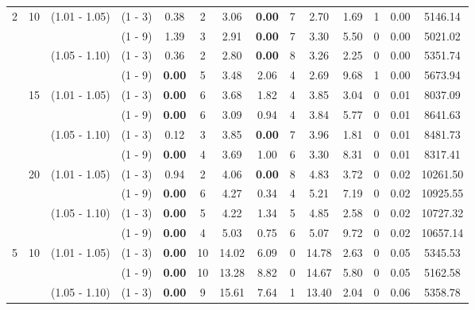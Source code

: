 \documentclass[a4paper,11pt]{article}
\begin{document}
\begin{table}[!ht]
\begin{tabular}{|c|c|c|c|c|c|c|c|c|c|c|c|c|c|}
2& 	10 & (1.01 - 1.05) & (1 - 3)   &  0.38  		& 2 & 		3.06      & \textbf{0.00} 	&  7    &  2.70      &  1.69  &		1 &  0.00      &  5146.14 \\
 &  &  & 				 (1 - 9)  &   1.39  		& 3 &		2.91      &  \textbf{0.00}  &  7	&  3.30      &  5.50  &	0	&  0.00      &  5021.02  \\
 &  & 	 (1.05 - 1.10) & (1 - 3)  &   0.36  		& 2 &		2.80      &  \textbf{0.00}  &  8	&  3.26      &  2.25  &	0	&  0.00      &  5351.74  \\
 &  &  & 				 (1 - 9)  &   \textbf{0.00} & 5 &		3.48      &  2.06  		    &  4	&  2.69  	 &  9.68  &	1	&  0.00      &  5673.94  \\
 & 	15 & (1.01 - 1.05) & (1 - 3)  &   \textbf{0.00} & 6 &		3.68      &  1.82  		    &  4	&  3.85  	 &  3.04  &	0	&  0.01      &  8037.09  \\
 &  &  & 				 (1 - 9)  &   \textbf{0.00} & 6 &		3.09      &  0.94  		    &  4	&  3.84  	 &  5.77  &	0	&  0.01      &  8641.63  \\
 &  & 	 (1.05 - 1.10) & (1 - 3)  &   0.12  		& 3 &		3.85      &  \textbf{0.00}  &  7	&  3.96      &  1.81  &	0	&  0.01      &  8481.73  \\
 &  &  & 				 (1 - 9)  &  \textbf{0.00}  & 4 &		3.69      &  1.00  		    &  6	&  3.30  	 &  8.31  &		0    &  0.01      &  8317.41  \\
 & 	20 & (1.01 - 1.05) & (1 - 3)  &  0.94	        & 2 &		4.06      &  \textbf{0.00}  &  8	&  4.83      &  3.72 &		0     &  0.02      &  10261.50 \\
 &  &  & 				 (1 - 9)  &  \textbf{0.00} & 6 &		4.27      &  0.34  		    &  4	&  5.21      &  7.19 &		0     &  0.02      &  10925.55 \\
 &  &    (1.05 - 1.10) & (1 - 3)  &  \textbf{0.00} & 5 &		4.22      &  1.34  		    &  5	&  4.85      &  2.58 &		0     &  0.02      &  10727.32 \\
 &  &  & 				 (1 - 9)  &  \textbf{0.00} & 4 &		5.03      &  0.75  		    &  6	&  5.07      &  9.72 &		0     &  0.02      &  10657.14 \\
5& 	10 & (1.01 - 1.05) & (1 - 3)  &  \textbf{0.00}  & 10 &		14.02      &  6.09  	    &  0	&  14.78      &  2.63 &		0     &  0.05      &  5345.53  \\
 &  &  & 				 (1 - 9)  &  \textbf{0.00}  & 10 &		13.28      &  8.82  	    &  0	&  14.67      &  5.80 &		0     &  0.05      &  5162.58  \\
 &  & 	 (1.05 - 1.10) & (1 - 3)  &  \textbf{0.00}  & 9 &		15.61      &  7.64  	    &  1	&  13.40      &  2.04 &		0     &  0.06      &  5358.78  \\

\end{tabular}
\end{table}
\end{document}
